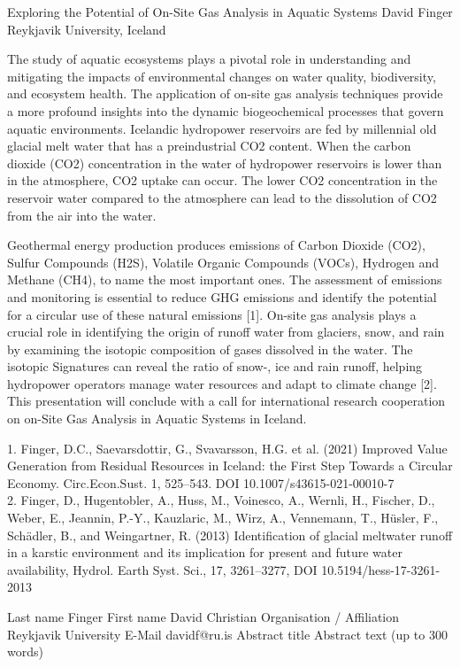 \begin{conf-abstract}
{Exploring the Potential of On-Site Gas Analysis in Aquatic Systems}
{David Finger}
{Reykjavik University, Iceland}
{The study of aquatic ecosystems plays a pivotal role in understanding and mitigating the impacts of environmental changes on water quality, biodiversity, and ecosystem health. The application of on-site gas analysis techniques provide a more profound insights into the dynamic biogeochemical processes that govern aquatic environments. 
Icelandic hydropower reservoirs are fed by millennial old glacial melt water that has a preindustrial CO2 content. When the carbon dioxide (CO2) concentration in the water of hydropower reservoirs is lower than in the atmosphere, CO2 uptake can occur. The lower CO2 concentration in the reservoir water compared to the atmosphere can lead to the dissolution of CO2 from the air into the water.

Geothermal energy production produces emissions of Carbon Dioxide (CO2), Sulfur Compounds (H2S), Volatile Organic Compounds (VOCs), Hydrogen and Methane (CH4), to name the most important ones. The assessment of emissions and monitoring is essential to reduce GHG emissions and identify the potential for a circular use of these natural emissions [1]. 
On-site gas analysis plays a crucial role in identifying the origin of runoff water from glaciers, snow, and rain by examining the isotopic composition of gases dissolved in the water. The isotopic Signatures can reveal the ratio of snow-, ice and rain runoff, helping hydropower operators manage water resources and adapt to climate change [2].
This presentation will conclude with a call for international research cooperation on on-Site Gas Analysis in Aquatic Systems in Iceland.

1. Finger, D.C., Saevarsdottir, G., Svavarsson, H.G. et al. (2021) Improved Value Generation from Residual Resources in Iceland: the First Step Towards a Circular Economy. Circ.Econ.Sust. 1, 525–543. DOI 10.1007/s43615-021-00010-7\\
2. Finger, D., Hugentobler, A., Huss, M., Voinesco, A., Wernli, H., Fischer, D., Weber, E., Jeannin, P.-Y., Kauzlaric, M., Wirz, A., Vennemann, T., Hüsler, F., Schädler, B., and Weingartner, R. (2013) Identification of glacial meltwater runoff in a karstic environment and its implication for present and future water availability, Hydrol. Earth Syst. Sci., 17, 3261–3277, DOI 10.5194/hess-17-3261-2013}
\end{conf-abstract}


Last name	Finger
First name	David Christian
Organisation / Affiliation	Reykjavik University
E-Mail	davidf@ru.is
Abstract title	
Abstract text (up to 300 words)	

